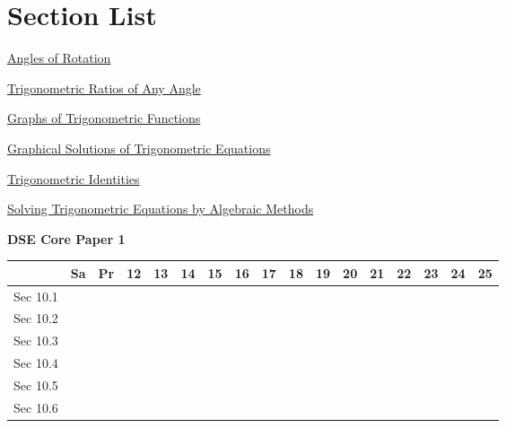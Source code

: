 \documentclass[12pt, a4paper]{article}
\begin{document}
\section*{Section List}
\begin{enumx}[label=Sec 10.\arabic*\ ]
\item \hyperref[section:4-10-1]{Angles of Rotation }
\item \hyperref[section:4-10-2]{Trigonometric Ratios of Any Angle }
\item \hyperref[section:4-10-3]{Graphs of Trigonometric Functions}
\item \hyperref[section:4-10-4]{Graphical Solutions of Trigonometric Equations}
\item \hyperref[section:4-10-5]{Trigonometric Identities}
\item \hyperref[section:4-10-6]{Solving Trigonometric Equations by Algebraic Methods}
\end{enumx}
\begin{absolutelynopagebreak}
\begin{center}
\textbf{DSE Core Paper 1}
\end{center}
\begin{center}
\begin{tabular}{|l|c|c|c|c|c|c|c|c|c|c|c|c|c|c|c|c|}
\hline
        & Sa & Pr & 12 & 13 & 14 & 15 & 16 & 17 & 18 & 19 & 20 & 21 & 22 & 23 & 24 & 25 \\\hline\hline
Sec 10.1 &  &  &  &  &  &  &  &  &  &  &  &  &  &  &  &  \\\hline
Sec 10.2 &  &  &  &  &  &  &  &  &  &  &  &  &  &  &  &  \\\hline
Sec 10.3 &  &  &  &  &  &  &  &  &  &  &  &  &  &  &  &  \\\hline
Sec 10.4 &  &  &  &  &  &  &  &  &  &  &  &  &  &  &  &  \\\hline
Sec 10.5 &  &  &  &  &  &  &  &  &  &  &  &  &  &  &  &  \\\hline
Sec 10.6 &  &  &  &  &  &  &  &  &  &  &  &  &  &  &  &  \\\hline
\end{tabular}
\end{center}
\end{absolutelynopagebreak}
\end{document}

